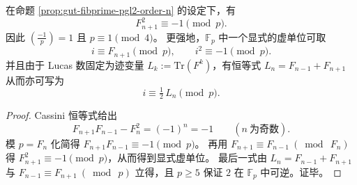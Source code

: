 \begin{corollary}\label{cor:gut-fibprime-explicit-i}
在命题 \ref{prop:gut-fibprime-pgl2-order-n} 的设定下，有
\[
F_{n+1}^2\equiv -1\pmod p.
\]
因此 \(\left(\frac{-1}{p}\right)=1\) 且 \(p\equiv 1\pmod 4\)。
更强地，\(\mathbb{F}_p\) 中一个显式的虚单位可取
\[
i\equiv F_{n+1}\pmod p,
\qquad i^2\equiv -1\pmod p.
\]
并且由于 Lucas 数固定为迹变量 \(L_k:=\mathrm{Tr}(F^k)\)，有恒等式
\(
L_n=F_{n-1}+F_{n+1}
\)
从而亦可写为
\[
i\equiv \tfrac12\,L_n\pmod p.
\]
\end{corollary}
\begin{proof}
Cassini 恒等式给出
\[
F_{n+1}F_{n-1}-F_n^2=(-1)^n=-1
\qquad(n\ \text{为奇数}).
\]
模 \(p=F_n\) 化简得 \(F_{n+1}F_{n-1}\equiv -1\pmod p\)。
再用 \(F_{n+1}\equiv F_{n-1}\ (\bmod\ F_n)\) 得 \(F_{n+1}^2\equiv -1\pmod p\)，从而得到显式虚单位。
最后一式由 \(L_n=F_{n-1}+F_{n+1}\) 与 \(F_{n-1}\equiv F_{n+1}\ (\bmod\ p)\) 立得，且 \(p\ge 5\) 保证 \(2\) 在 \(\mathbb{F}_p\) 中可逆。证毕。
\end{proof}

